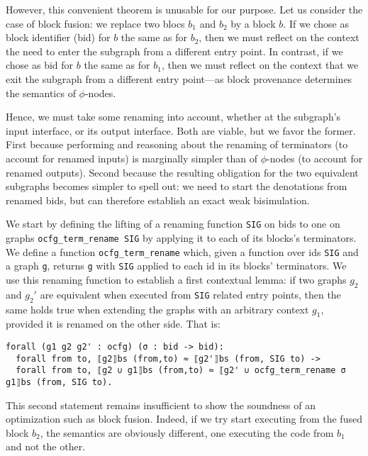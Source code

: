 \documentclass[11pt]{article}
\newcommand{\inlinecoq}[1]{\mbox{\lstinline[style=customcoq,columns=fixed,basewidth=.48em]{#1}}}
\newcommand{\ilc}[1]{\inlinecoq{#1}}
\newcommand{\yzt}[1]{\textcolor{ForestGreen!50}{#1}}
\begin{document}
\yzt{However, this convenient theorem is unusable for our purpose. Let us consider the case of block fusion: we replace two blocs $b_1$ and $b_2$ by a block $b$.
If we chose as block identifier (bid) for $b$ the same as for $b_2$, then we must reflect on the context the need to enter the subgraph from a different entry point.
In contrast, if we chose as bid for $b$ the same as for $b_1$, then we must reflect on the context that we exit the subgraph from a different entry point---as block provenance determines the semantics of $\phi$-nodes.}

\yzt{Hence, we must take some renaming into account, whether at the subgraph's input interface, or its output interface. Both are viable, but we favor the former. First because performing and reasoning about the renaming of terminators (to account for renamed inputs) is marginally simpler than of $\phi$-nodes (to account for renamed outputs). Second because the resulting obligation for the two equivalent subgraphs becomes simpler to spell out: we need to start the denotations from renamed bids, but can therefore establish an exact weak bisimulation.}

We start by defining the lifting of a renaming function \ilc{SIG} on bids to one on graphs \ilc{ocfg_term_rename SIG} by applying it to each of its blocks's terminators.
We define a function \ilc{ocfg_term_rename} which, given a function over ids \ilc{SIG} and a graph \ilc{g}, returns \ilc{g} with \ilc{SIG} applied to each id in its blocks' terminators.
We use this renaming function to establish a first contextual lemma: if two graphs $g_2$ and $g_2'$ are equivalent when executed from \ilc{SIG} related entry points, then the same holds true when extending the graphs with an arbitrary context $g_1$, provided it is renamed on the other side. That is:
  \begin{lstlisting}[style=customcoq,basicstyle=\small\ttfamily]
forall (g1 g2 g2' : ocfg) (σ : bid -> bid):
  forall from to, ⟦g2⟧bs (from,to) ≈ ⟦g2'⟧bs (from, SIG to) ->
  forall from to, ⟦g2 ∪ g1⟧bs (from,to) ≈ ⟦g2' ∪ ocfg_term_rename σ g1⟧bs (from, SIG to).
  \end{lstlisting}

This second statement remains insufficient to show the soundness of an optimization such as block fusion. Indeed, if we try start executing from the fused block $b_2$, the semantics are obviously different, one executing the code from $b_1$ and not the other.
\end{document}
